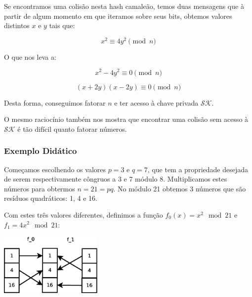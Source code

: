 \documentclass[a4paper]{article}
\begin{document}
Se encontramos uma colisão nesta hash camaleão, temos duas mensagens
que à partir de algum momento em que iteramos sobre seus bits, obtemos
valores distintos $x$ e $y$ tais que:

$$
x^2 \equiv 4y^2 \pmod n
$$

O que nos leva a:

$$
x^2 - 4y^2 \equiv 0 \pmod n
$$

$$
(x+2y)(x-2y) \equiv 0 \pmod n
$$

Desta forma, conseguimos fatorar $n$ e ter acesso à chave privada
$\mathcal{SK}$.

O mesmo raciocínio também nos mostra que encontrar uma colisão sem
acesso à $\mathcal{SK}$ é tão difícil quanto fatorar números.





  

\subsubsection{Exemplo Didático}

Começamos escolhendo os valores $p=3$ e $q=7$, que tem a propriedade
desejada de serem respectivamente côngruos a 3 e 7 módulo
8. Multiplicamos estes números para obtermos $n = 21 = pq$. No módulo
21 obtemos 3 números que são resíduos quadráticos: 1, 4 e 16.

Com estes três valores diferentes, definimos a função $f_0(x)=x^2\mod
21$ e $f_1=4x^2\mod 21$:

\includegraphics[width=5cm]{imagens/toy1.eps}
\end{document}
